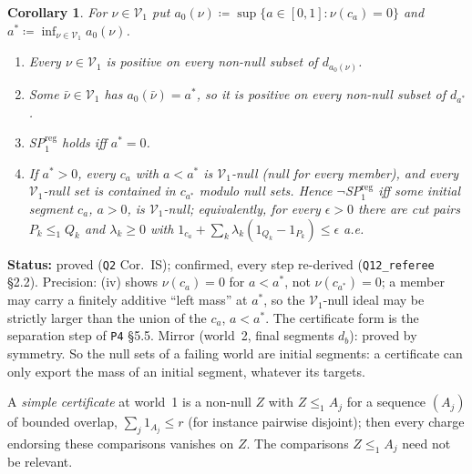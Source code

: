 \documentclass[11pt]{article}
\newtheorem{corollary}[theorem]{Corollary}
\theoremstyle{definition}
\theoremstyle{remark}
\newcommand{\src}[1]{\texttt{#1}}
\newcommand{\status}[1]{\par\smallskip\noindent\textbf{Status:} #1\par\smallskip}
\begin{document}
\begin{corollary}\label{cor:IS}
For $\nu\in\mathcal V_1$ put $a_0(\nu)\coloneqq\sup\{a\in[0,1]:\nu(c_a)=0\}$ and $a^*\coloneqq\inf_{\nu\in\mathcal V_1}a_0(\nu)$.
\begin{enumerate}[leftmargin=*,label=(\roman*)]
\item Every $\nu\in\mathcal V_1$ is positive on every non-null subset of $d_{a_0(\nu)}$.
\item Some $\bar\nu\in\mathcal V_1$ has $a_0(\bar\nu)=a^*$, so it is positive on every non-null subset of $d_{a^*}$.
\item SP$^{\mathrm{reg}}_1$ holds iff $a^*=0$.
\item If $a^*>0$, every $c_a$ with $a<a^*$ is $\mathcal V_1$-null (null for every member), and every $\mathcal V_1$-null set is contained in $c_{a^*}$ modulo null sets. Hence $\neg$SP$^{\mathrm{reg}}_1$ iff some initial segment $c_a$, $a>0$, is $\mathcal V_1$-null; equivalently, for every $\epsilon>0$ there are cut pairs $P_k\le_1Q_k$ and $\lambda_k\ge0$ with $1_{c_a}+\sum_k\lambda_k(1_{Q_k}-1_{P_k})\le\epsilon$ a.e.
\end{enumerate}
\end{corollary}
\status{proved (\src{Q2} Cor.~IS); confirmed, every step re-derived (\src{Q12\_referee} \S2.2). Precision: (iv) shows $\nu(c_a)=0$ for $a<a^*$, not $\nu(c_{a^*})=0$; a member may carry a finitely additive ``left mass'' at $a^*$, so the $\mathcal V_1$-null ideal may be strictly larger than the union of the $c_a$, $a<a^*$. The certificate form is the separation step of \src{P4} \S5.5. Mirror (world~2, final segments $d_b$): proved by symmetry. So the null sets of a failing world are initial segments: a certificate can only export the mass of an initial segment, whatever its targets.}

A \emph{simple certificate} at world~1 is a non-null $Z$ with $Z\le_1A_j$ for a sequence $(A_j)$ of bounded overlap, $\sum_j1_{A_j}\le r$ (for instance pairwise disjoint); then every charge endorsing these comparisons vanishes on $Z$. The comparisons $Z\le_1A_j$ need not be relevant.
\end{document}
